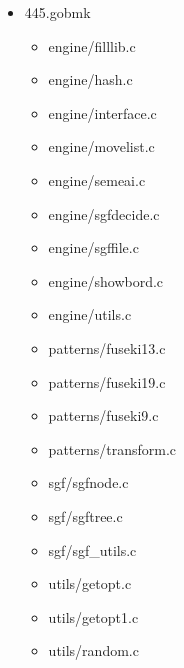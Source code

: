 \begin{multicols}{3}
\begin{itemize}
	\item 445.gobmk
	\begin{itemize}
		\item engine/filllib.c
		\item engine/hash.c
		\item engine/interface.c
		\item engine/movelist.c
		\item engine/semeai.c
		\item engine/sgfdecide.c
		\item engine/sgffile.c
		\item engine/showbord.c
		\item engine/utils.c
		\item patterns/fuseki13.c
		\item patterns/fuseki19.c
		\item patterns/fuseki9.c
		\item patterns/transform.c
		\item sgf/sgfnode.c
		\item sgf/sgftree.c
		\item sgf/sgf\_utils.c
		\item utils/getopt.c
		\item utils/getopt1.c
		\item utils/random.c
	\end{itemize}


\end{itemize}
\end{multicols}
